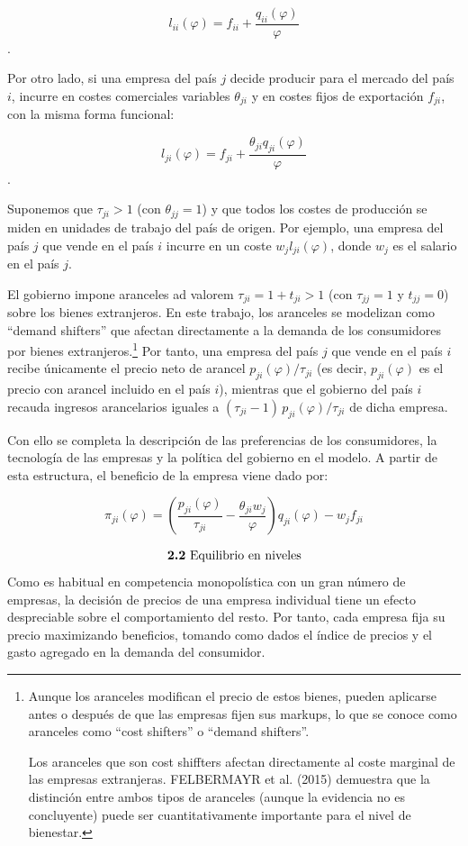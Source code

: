 \documentclass[10pt,a4paper]{article}
\begin{document}
$$l_{ii}(\varphi) = f_{ii} + \frac{q_{ii}(\varphi)}{\varphi}$$.

Por otro lado, si una empresa del país $j$ decide producir para el mercado del país $i$, incurre en costes comerciales variables $\theta_{ji}$ y en costes fijos de exportación $f_{ji}$, con la misma forma funcional:

$$l_{ji}(\varphi) = f_{ji} + \frac{\theta_{ji} q_{ji}(\varphi)}{\varphi}$$.

Suponemos que $\tau_{ji} > 1$ (con $\theta_{jj} = 1$) y que todos los costes de producción se miden en unidades de trabajo del país de origen. Por ejemplo, una empresa del país $j$ que vende en el país $i$ incurre en un coste $w_j l_{ji}(\varphi)$, donde $w_j$ es el salario en el país $j$.

El gobierno impone aranceles ad valorem $\tau_{ji} = 1 + t_{ji} > 1$ (con $\tau_{jj} = 1$ y $t_{jj} = 0$) sobre los bienes extranjeros. En este trabajo, los aranceles se modelizan como “demand shifters” que afectan directamente a la demanda de los consumidores por bienes extranjeros.\footnote{%
    Aunque los aranceles modifican el precio de estos bienes, pueden aplicarse antes o después de que las empresas fijen sus markups, lo que se conoce como aranceles como “cost shifters” o “demand shifters”.

Los aranceles que son cost shiffters afectan directamente al coste marginal de las empresas extranjeras. FELBERMAYR et al. (2015) demuestra que la distinción entre ambos tipos de aranceles (aunque la evidencia no es concluyente) puede ser cuantitativamente importante para el nivel de bienestar.
} Por tanto, una empresa del país $j$ que vende en el país $i$ recibe únicamente el precio neto de arancel $p_{ji}(\varphi)/\tau_{ji}$ (es decir, $p_{ji}(\varphi)$ es el precio con arancel incluido en el país $i$), mientras que el gobierno del país $i$ recauda ingresos arancelarios iguales a $(\tau_{ji}-1)\,p_{ji}(\varphi)/\tau_{ji}$ de dicha empresa.

Con ello se completa la descripción de las preferencias de los consumidores, la tecnología de las empresas y la política del gobierno en el modelo. A partir de esta estructura, el beneficio de la empresa viene dado por:

$$\pi_{ji}(\varphi) =\left(\frac{p_{ji}(\varphi)}{\tau_{ji}} - \frac{\theta_{ji} w_j}{\varphi}\right) q_{ji}(\varphi) - w_j f_{ji}$$


$$\text{\textbf{2.2} Equilibrio en niveles}$$
Como es habitual en competencia monopolística con un gran número de empresas, la decisión de precios de una empresa individual tiene un efecto despreciable sobre el comportamiento del resto. Por tanto, cada empresa fija su precio maximizando beneficios, tomando como dados el índice de precios y el gasto agregado en la demanda del consumidor. 
\end{document}
